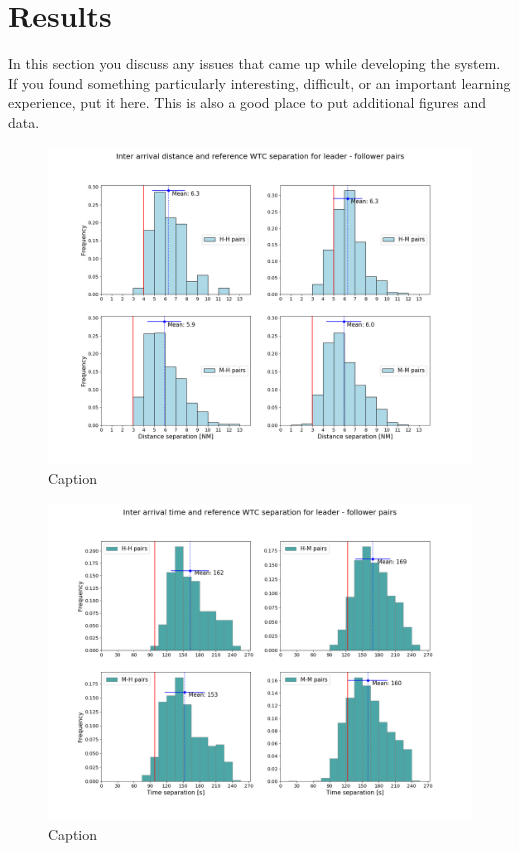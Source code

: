 \chapter{Results}

In this section you discuss any issues that came up while developing
the system.  If you found something particularly interesting,
difficult, or an important learning experience, put it here.  This is
also a good place to put additional figures and data.


\begin{figure}
    \centering
    \includegraphics[width=1\textwidth]{graphics/fig_dist_separ_HH_HM_MH_MM_pairs.png}
    \caption[list of figures caption]{Caption}
    \label{fig:dist_separ_HH_HM_MH_MM_pairs}
\end{figure}

\begin{figure}
    \centering
    \includegraphics[width=1\textwidth]{graphics/fig_time_separ_HH_HM_MH_MM_pairs.png}
    \caption[list of figures caption]{Caption}
    \label{fig:time_separ_HH_HM_MH_MM_pairs}
\end{figure}


